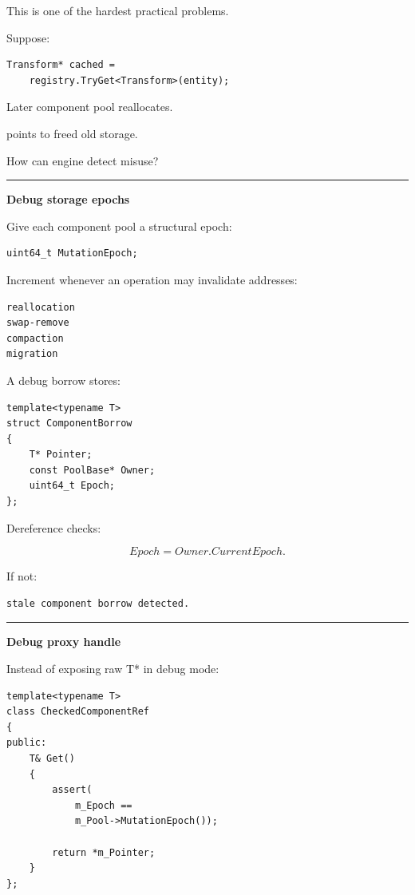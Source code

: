 This is one of the hardest practical problems.

Suppose:

\begin{verbatim}
Transform* cached =
    registry.TryGet<Transform>(entity);
\end{verbatim}

Later component pool reallocates.

 points to freed old storage.

How can engine detect misuse?

\begin{center}\rule{0.5\linewidth}{0.5pt}\end{center}

\textbf{Debug storage epochs}

Give each component pool a structural epoch:

\begin{verbatim}
uint64_t MutationEpoch;
\end{verbatim}

Increment whenever an operation may invalidate addresses:

\begin{verbatim}
reallocation
swap-remove
compaction
migration
\end{verbatim}

A debug borrow stores:

\begin{verbatim}
template<typename T>
struct ComponentBorrow
{
    T* Pointer;
    const PoolBase* Owner;
    uint64_t Epoch;
};
\end{verbatim}

Dereference checks:

\[
Epoch=Owner.CurrentEpoch.
\]

If not:

\begin{verbatim}
stale component borrow detected.
\end{verbatim}

\begin{center}\rule{0.5\linewidth}{0.5pt}\end{center}

\textbf{Debug proxy handle}

Instead of exposing raw T* in debug mode:

\begin{verbatim}
template<typename T>
class CheckedComponentRef
{
public:
    T& Get()
    {
        assert(
            m_Epoch ==
            m_Pool->MutationEpoch());

        return *m_Pointer;
    }
};
\end{verbatim}

